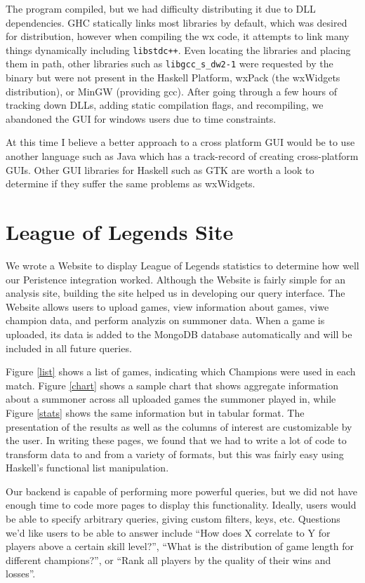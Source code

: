 \documentclass[letterpaper,twocolumn,9pt]{article}
\newcommand{\code}[1]{\texttt{#1}}
\begin{document}
The program compiled, but we had difficulty distributing it due to DLL dependencies.  GHC statically links most libraries by default, which was desired for distribution, however when compiling the wx code, it attempts to link many things dynamically including \code{libstdc++}.  Even locating the libraries and placing them in path, other libraries such as \code{libgcc\_s\_dw2-1} were requested by the binary but were not present in the Haskell Platform, wxPack (the wxWidgets distribution), or MinGW (providing gcc).  After going through a few hours of tracking down DLLs, adding static compilation flags, and recompiling, we abandoned the GUI for windows users due to time constraints.

At this time I believe a better approach to a cross platform GUI would be to use another language such as Java which has a track-record of creating cross-platform GUIs. Other GUI libraries for Haskell such as GTK are worth a look to determine if they suffer the same problems as wxWidgets.

\section{League of Legends Site}
\label{site}

We wrote a Website to display League of Legends statistics to determine how well our Peristence integration worked. Although the Website is fairly simple for an analysis site, building the site helped us in developing our query interface. The Website allows users to upload games, view information about games, viwe champion data, and perform analyzis on summoner data. When a game is uploaded, its data is added to the MongoDB database automatically and will be included in all future queries.

Figure \ref{list} shows a list of games, indicating which Champions were used in each match. Figure \ref{chart} shows a sample chart that shows aggregate information about a summoner across all uploaded games the summoner played in, while Figure \ref{stats} shows the same information but in tabular format. The presentation of the results as well as the columns of interest are customizable by the user. In writing these pages, we found that we had to write a lot of code to transform data to and from a variety of formats, but this was fairly easy using Haskell's functional list manipulation. 

Our backend is capable of performing more powerful queries, but we did not have enough time to code more pages to display this functionality. Ideally, users would be able to specify arbitrary queries, giving custom filters, keys, etc. Questions we'd like users to be able to answer include ``How does X correlate to Y for players above a certain skill level?'', ``What is the distribution of game length for different champions?'', or ``Rank all players by the quality of their wins and losses''. 
\end{document}
